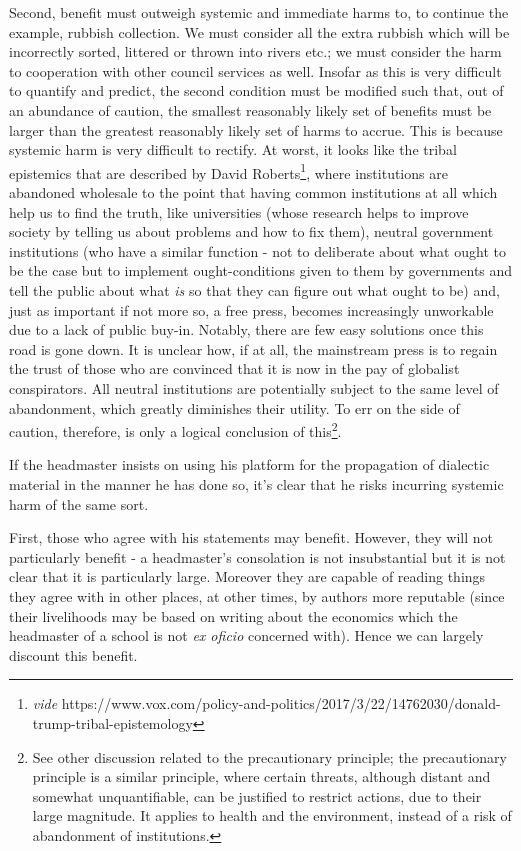 \documentclass[12pt,a4paper]{report}
\newcounter{count}
\begin{document}
\begin{multicols}{2}
\begin{multicols}{2}
Second, benefit must outweigh systemic and immediate harms to, to
continue the example, rubbish collection. We must consider all the extra
rubbish which will be incorrectly sorted, littered or thrown into rivers
etc.; we must consider the harm to cooperation with other council
services as well. Insofar as this is very difficult to quantify and
predict, the second condition must be modified such that, out of an
abundance of caution, the smallest reasonably likely set of benefits
must be larger than the greatest reasonably likely set of harms to
accrue. This is because systemic harm is very difficult to rectify. At
worst, it looks like the tribal epistemics that are described by David
Roberts\footnote{\textit{vide}
	https://www.vox.com/policy-and-politics/2017/3/22/14762030/donald-trump-tribal-epistemology},
where institutions are abandoned wholesale to the point that having
common institutions at all which help us to find the truth, like
universities (whose research helps to improve society by telling us
about problems and how to fix them), neutral government institutions
(who have a similar function - not to deliberate about what ought to be
the case but to implement ought-conditions given to them by governments
and tell the public about what \textit{is} so that they can figure out
what ought to be) and, just as important if not more so, a free press,
becomes increasingly unworkable due to a lack of public buy-in. Notably,
there are few easy solutions once this road is gone down. It is unclear
how, if at all, the mainstream press is to regain the trust of those who
are convinced that it is now in the pay of globalist conspirators. All
neutral institutions are potentially subject to the same level of
abandonment, which greatly diminishes their utility. To err on the side
of caution, therefore, is only a logical conclusion of this\footnote{See
	other discussion related to the precautionary principle; the
	precautionary principle is a similar principle, where certain threats,
	although distant and somewhat unquantifiable, can be justified to
	restrict actions, due to their large magnitude. It applies to health
	and the environment, instead of a risk of abandonment of institutions.}.

If the headmaster insists on using his platform for the propagation of
dialectic material in the manner he has done so, it's clear that he
risks incurring systemic harm of the same sort.

First, those who agree with his statements may benefit. However, they
will not particularly benefit - a headmaster's consolation is not
insubstantial but it is not clear that it is particularly large.
Moreover they are capable of reading things they agree with in other
places, at other times, by authors more reputable (since their
livelihoods may be based on writing about the economics which the
headmaster of a school is not \textit{ex oficio} concerned with). Hence we
can largely discount this benefit.


\end{multicols}
\end{multicols}
\end{document}
